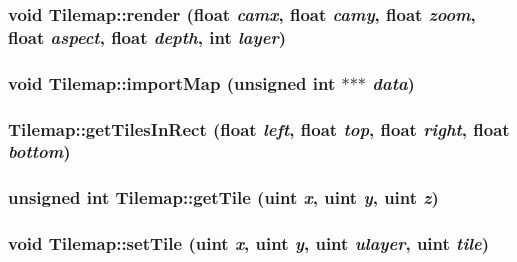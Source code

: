 \subsubsection{\setlength{\rightskip}{0pt plus 5cm}void Tilemap::render (float {\em camx}, float {\em camy}, float {\em zoom}, float {\em aspect}, float {\em depth}, int {\em layer})}\label{classEngine_1_1Tilemap_35a3606b42b7ae4d29438bcf31c0d226}


\subsubsection{\setlength{\rightskip}{0pt plus 5cm}void Tilemap::importMap (unsigned int $\ast$$\ast$$\ast$ {\em data})}\label{classEngine_1_1Tilemap_34e4d7b9f647053656ff0a22b764fb54}


\subsubsection{ Tilemap::getTilesInRect (float {\em left}, float {\em top}, float {\em right}, float {\em bottom})}\label{classEngine_1_1Tilemap_fb1dc644d8eced669eaca59ac19b4427}


\subsubsection{\setlength{\rightskip}{0pt plus 5cm}unsigned int Tilemap::getTile ({\bf uint} {\em x}, {\bf uint} {\em y}, {\bf uint} {\em z})}\label{classEngine_1_1Tilemap_f991ac41a23060f60255993154aab10b}


\subsubsection{\setlength{\rightskip}{0pt plus 5cm}void Tilemap::setTile ({\bf uint} {\em x}, {\bf uint} {\em y}, {\bf uint} {\em ulayer}, {\bf uint} {\em tile})}\label{classEngine_1_1Tilemap_d625d016d4bdd948c1c853a8a3297c23}


